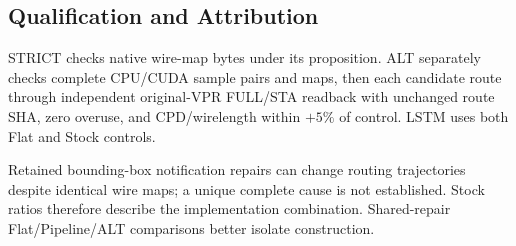 \subsection{Qualification and Attribution}
STRICT checks native wire-map bytes under its proposition. ALT separately checks complete CPU/CUDA sample pairs and maps, then each candidate route through independent original-VPR FULL/STA readback with unchanged route SHA, zero overuse, and CPD/wirelength within $+5\%$ of control. LSTM uses both Flat and Stock controls.

Retained bounding-box notification repairs can change routing trajectories despite identical wire maps; a unique complete cause is not established. Stock ratios therefore describe the implementation combination. Shared-repair Flat/Pipeline/ALT comparisons better isolate construction.
